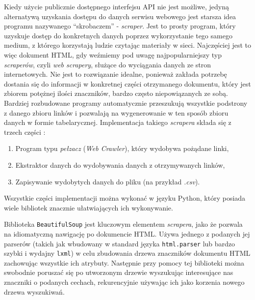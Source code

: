 Kiedy użycie publicznie dostępnego interfejsu API nie jest możliwe, jedyną alternatywą uzyskania dostępu do danych serwisu webowego jest starsza idea programu nazywanego ``skrobaczem'' - \emph{scraper}.
Jest to prosty program, który uzyskuje dostęp do konkretnych danych poprzez wykorzystanie tego samego medium, z którego korzystają ludzie czytając materiały w sieci.
Najczęściej jest to więc dokument HTML, gdy weźmiemy pod uwagę najpopularniejszy typ \emph{scraperów}, czyli \emph{web scrapery}, służące do wyciągania danych ze stron internetowych.
Nie jest to rozwiązanie idealne, ponieważ zakłada potrzebę dostania się do informacji w konkretnej części otrzymanego dokumentu, który jest zbiorem potężnej ilości znaczników, bardzo często niepowiązanych ze sobą.
Bardziej rozbudowane programy automatycznie przeszukują wszystkie podstrony z danego zbioru linków i pozwalają na wygenerowanie w ten sposób zbioru danych w formie tabelarycznej.
Implementacja takiego \emph{scrapera} składa się z trzech części \cite{mahto2016dive}:
\begin{enumerate}
	\item Program typu \emph{pełzacz} (\emph{Web Crawler}), który wydobywa pożądane linki,
	\item Ekstraktor danych do wydobywania danych z otrzymywanych linków,
	\item Zapisywanie wydobytych danych do pliku (na przykład \emph{.csv}).
\end{enumerate}
Wszystkie części implementacji można wykonać w języku Python, który posiada wiele bibliotek znacznie ułatwiających ich wykonywanie.

Biblioteka \texttt{BeautifulSoup} jest kluczowym elementem \emph{scrapera}, jako że pozwala na idiomatyczną nawigację po dokumencie HTML.
Używa jednego z podanych jej parserów (takich jak wbudowany w standard języka \texttt{html.parser} lub bardzo szybki i wydajny \texttt{lxml}) w celu zbudowania drzewa znaczników dokumentu HTML zachowując wszystkie ich atrybuty.
Następnie przy pomocy tej biblioteki można swobodnie poruszać się po utworzonym drzewie wyszukując interesujące nas znaczniki o podanych cechach, rekurencyjnie używając ich jako korzenia nowego drzewa wyszukiwań.

